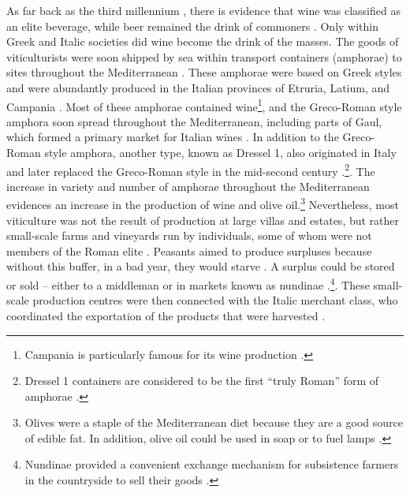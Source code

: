 As far back as the third millennium \BC, there is evidence that wine was classified as an elite beverage, while beer remained the drink of commoners \parencite[233]{Dietler_2006}. Only within Greek and Italic societies did wine become the drink of the masses. The goods of viticulturists were soon shipped by sea within transport containers (amphorae) to sites throughout the Mediterranean \parencite[9]{Moore_1995}. These amphorae were based on Greek styles and were abundantly produced in the Italian provinces of Etruria, Latium, and Campania \parencite[285]{Woolf_1992}. Most of these amphorae contained wine\footnote{Campania is particularly famous for its wine production \parencite[6]{Purcell_1985}.}, and the Greco-Roman style amphora soon spread throughout the Mediterranean, including parts of Gaul, which formed a primary market for Italian wines \parencites[141]{Tchernia_2006}[7]{Purcell_1985}[285]{Woolf_1992}. In addition to the Greco-Roman style amphora, another type, known as Dressel 1, also originated in Italy and later replaced the Greco-Roman style in the mid-second century \BC \parencites[263]{Peacock_1977}[285]{Woolf_1992}.\footnote{Dressel 1 containers are considered to be the first “truly Roman” form of amphorae \parencite[86]{Toscana_1995}.}. The increase in variety and number of amphorae throughout the Mediterranean evidences an increase in the production of wine and olive oil.\footnote{Olives were a staple of the Mediterranean diet because they are a good source of edible fat. In addition, olive oil could be used in soap or to fuel lamps \parencite[31]{Finley_1999}.} Nevertheless, most viticulture was not the result of production at large villas and estates, but rather small-scale farms and vineyards run by individuals, some of whom were not members of the Roman elite \parencites[163]{Kron_2012}[7]{Purcell_1985}. Peasants aimed to produce surpluses because without this buffer, in a bad year, they would starve \parencite[22]{Bowman_2013}. A surplus could be stored or sold – either to a middleman or in markets known as nundinae \parencite[113]{Storey_2004}.\footnote{Nundinae provided a convenient exchange mechanism for subsistence farmers in the countryside to sell their goods \parencite[113]{Storey_2004}.}.  These small-scale production centres were then connected with the Italic merchant class, who coordinated the exportation of the products that were harvested \parencites[47]{Kehoe_2013}[8]{Purcell_1985}. 


